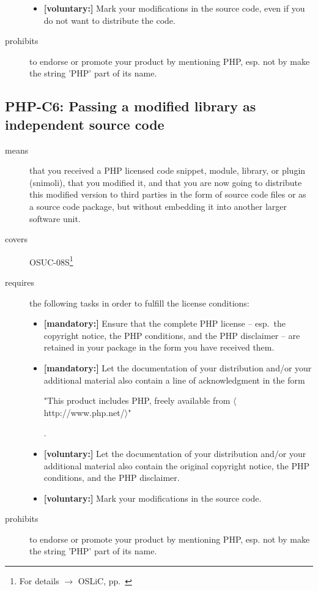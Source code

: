 \begin{description}
\begin{itemize}
  \item \textbf{[voluntary:]} Mark your modifications in the source code,
  even if you do not want to distribute the code.

\end{itemize}

\item[prohibits] to endorse or promote your product by mentioning PHP, esp. not
by make the string 'PHP' part of its name.

\end{description}

\subsection{PHP-C6: Passing a modified library as independent source code}
\label{OSUC-08S-PHP}
\begin{description}
\item[means] that you received a PHP licensed code snippet, module, library,
  or plugin (snimoli), that you modified it, and that you are now going to
  distribute this modified version to third parties in the form of source code
  files or as a source code package, but without embedding it into another
  larger software unit.

\item[covers] OSUC-08S\footnote{For details $\rightarrow$ OSLiC, pp.\
\pageref{OSUC-08S-DEF}}
\item[requires] the following tasks in order to fulfill the license conditions:
\begin{itemize}
  
  \item \textbf{[mandatory:]} Ensure that the complete PHP license -- esp.\
  the copyright notice, the PHP conditions, and the PHP disclaimer -- are
  retained in your package in the form you have received them.
  
  \item \textbf{[mandatory:]} Let the documentation of your distribution and/or
  your additional material also contain a line of acknowledgment in the form
  \begin{footnotesize}"This product includes PHP, freely available from
  $\langle$http://www.php.net/$\rangle$"\end{footnotesize}.
    
  \item \textbf{[voluntary:]} Let the documentation of your distribution and/or
  your additional material also contain the original copyright notice, the PHP
  conditions, and the PHP disclaimer.
     
  \item \textbf{[voluntary:]} Mark your modifications in the source code.
  
\end{itemize}

\item[prohibits] to endorse or promote your product by mentioning PHP, esp. not
by make the string 'PHP' part of its name.

\end{description}


